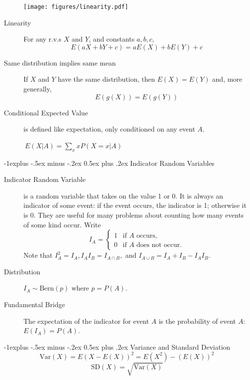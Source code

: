 \documentclass[10pt,landscape]{article}
\makeatletter
\newcommand{\var}{\textrm{Var}}
\newcommand{\Bern}{\textrm{Bern}}
\renewcommand{\subsection}{\@startsection{subsection}{2}{0mm}%
                                {-1explus -.5ex minus -.2ex}%
                                {0.5ex plus .2ex}%
                                {\normalfont\normalsize\bfseries}}
\makeatother
\begin{document}
\begin{multicols*}{3}
\begin{description}
		\begin{minipage}{\linewidth}
			\centering
			\texttt{[image: figures/linearity.pdf]}
		\end{minipage}
		
		\item[Linearity] For any r.v.s $X$ and $Y$, and constants $a,b,c,$ 
		\[E(aX + bY + c) = aE(X) + bE(Y) + c \]
						
		\item[Same distribution implies same mean] If $X$ and $Y$ have the same distribution, then $E(X)=E(Y)$ and, more generally, 
		$$E(g(X)) = E(g(Y))$$
						
		\item[Conditional Expected Value] is defined like expectation, only conditioned on any event $A$. \begin{center}
		$\ E(X | A) = \sum\limits_{x}xP(X=x | A)$
		\end{center}
	\end{description}
			
	\subsection{Indicator Random Variables}
	\begin{description}
		\item[Indicator Random Variable] is a random variable that takes on the value 1 or 0. It is always an indicator of some event: if the event occurs, the indicator is 1; otherwise it is 0. They are useful for many problems about counting how many events of some kind occur. Write \[
		I_A =
		\begin{cases}
			1 & \text{if $A$ occurs,}         \\
			0 & \text{if $A$ does not occur.} 
		\end{cases}
	\]
	Note that $I_A^2 = I_A, I_A I_B = I_{A \cap B}, $ and $I_{A \cup B} = I_A + I_B - I_A I_B$. 
	\item[Distribution] $I_A \sim \Bern(p)$ where $p = P(A)$.
	\item[Fundamental Bridge] The expectation of the indicator for event $A$ is the probability of event $A$: $E(I_A) = P(A)$. 
	\end{description}
			
	\subsection{Variance and Standard Deviation}
	\[\var(X) = E \left(X - E(X)\right)^2 = E(X^2) - (E(X))^2\]
	\[\textrm{SD}(X) = \sqrt{\var(X)}\]
			

\end{multicols*}
\end{document}

